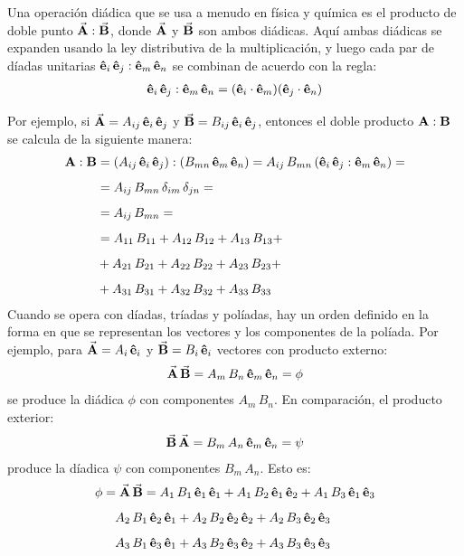 \documentclass[hidelinks,12pt]{article}
\begin{document}
Una operación diádica que se usa a menudo en física y química es el producto de doble punto $\va{A} : \va{B}$, donde $\va{A}$ y $\va{B}$ son ambos diádicas. Aquí ambas diádicas se expanden usando la ley distributiva de la multiplicación, y luego cada par de díadas unitarias $\vu{e}_{i} \, \vu{e}_{j} : \vu{e}_{m} \, \vu{e}_{n}$ se combinan de acuerdo con la regla:
\begin{align*}
\vu{e}_{i} \, \vu{e}_{j} : \vu{e}_{m} \, \vu{e}_{n} = (\vu{e}_{i} \cdot \vu{e}_{m}) (\vu{e}_{j} \cdot \vu{e}_{n})
\end{align*}

Por ejemplo, si $\va{A} = A_{ij} \, \vu{e}_{i} \, \vu{e}_{j}$ y $\va{B} = B_{ij} \, \vu{e}_{i} \, \vu{e}_{j}$, entonces el doble producto $\vb{A} : \vb{B}$ se calcula de la siguiente manera:
\begin{align*}
\vb{A} : \vb{B} &= \left( A_{ij} \, \vu{e}_{i} \, \vu{e}_{j} \right) : \left( B_{mn} \, \vu{e}_{m} \, \vu{e}_{n} \right) = A_{ij} \, B_{mn} \left( \vu{e}_{i} \, \vu{e}_{j} : \vu{e}_{m} \, \vu{e}_{n} \right) = \\[0.5em]
&= A_{ij} \, B_{mn} \, \delta_{im} \, \delta_{jn} = \\[0.5em]
&= A_{ij} \, B_{mn} = \\[0.5em]
&= A_{11} \, B_{11} + A_{12} \, B_{12} + A_{13} \, B_{13} + \\[0.5em] 
&+ A_{21} \, B_{21} + A_{22} \, B_{22} + A_{23} \, B_{23} + \\[0.5em] 
&+ A_{31} \, B_{31} + A_{32} \, B_{32} + A_{33} \, B_{33} 
\end{align*}
Cuando se opera con díadas, tríadas y políadas, hay un orden definido en la forma en que se representan los vectores y los componentes de la políada. Por ejemplo, para $\va{A} = A_{i} \, \vu{e}_{i}$ y $\va{B} = B_{i} \, \vu{e}_{i}$ vectores con producto externo:
\begin{align*}
\va{A} \, \va{B} = A_{m} \, B_{n} \, \vu{e}_{m} \, \vu{e}_{n} = \phi
\end{align*}
se produce la diádica $\phi$ con componentes $A_{m} \, B_{n}$. En comparación, el producto exterior:
\begin{align*}
\va{B} \, \va{A} = B_{m} \, A_{n} \, \vu{e}_{m} \, \vu{e}_{n} = \psi
\end{align*}
produce la díadica $\psi$ con componentes $B_{m} \, A_{n}$. Esto es:
\begin{align*}
\phi &= \va{A} \, \va{B} =  A_{1} \, B_{1} \, \vu{e}_{1} \, \vu{e}_{1} + A_{1} \, B_{2} \, \vu{e}_{1} \, \vu{e}_{2} + A_{1} \, B_{3} \, \vu{e}_{1} \, \vu{e}_{3} \\[0.5em]
&{\quad} A_{2} \, B_{1} \, \vu{e}_{2} \, \vu{e}_{1} + A_{2} \, B_{2} \, \vu{e}_{2} \, \vu{e}_{2} + A_{2} \, B_{3} \, \vu{e}_{2} \, \vu{e}_{3} \\[0.5em]
&{\quad} A_{3} \, B_{1} \, \vu{e}_{3} \, \vu{e}_{1} + A_{3} \, B_{2} \, \vu{e}_{3} \, \vu{e}_{2} + A_{3} \, B_{3} \, \vu{e}_{3} \, \vu{e}_{3}
\end{align*}
\end{document}
